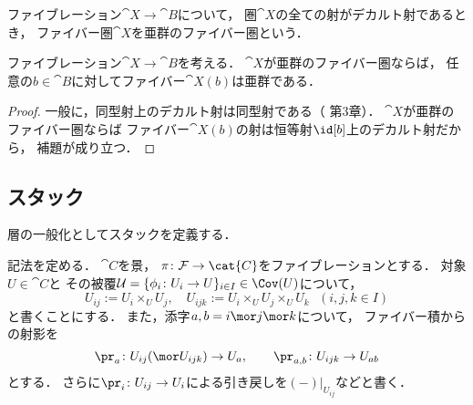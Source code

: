     \begin{Def}
        ファイブレーション$\cat{X} \to \cat{B}$について，
        圏$\cat{X}$の全ての射がデカルト射であるとき，
        ファイバー圏$\cat{X}$を亜群のファイバー圏という．
    \end{Def}

    \begin{Lemma}
        ファイブレーション$\cat{X} \to \cat{B}$を考える．
        $\cat{X}$が亜群のファイバー圏ならば，
        任意の$b \in \cat{B}$に対してファイバー$\cat{X}(b)$は亜群である．
    \end{Lemma}
    \begin{proof}
        一般に，同型射上のデカルト射は同型射である（\cite{FGAexp} 第$3$章）．
        $\cat{X}$が亜群のファイバー圏ならば
        ファイバー$\cat{X}(b)$の射は恒等射$\id[b]$上のデカルト射だから，
        補題が成り立つ．
    \end{proof}

\subsection{スタック}
    層の一般化としてスタックを定義する．

    記法を定める．
    $\cat{C}$を景，
    $\pi \colon \stF \to \cat{C}$をファイブレーションとする．
    対象$U \in \cat{C}$と
    その被覆$\covU=\{\phi_i \colon U_i \to U\}_{i \in I} \in \Cov(U)$について，
    \[ U_{ij}:=U_i \times_U U_j, \quad U_{ijk}:=U_i \times_U U_j \times_U U_k \ \ \ (i,j,k \in I) \]
    と書くことにする．
    また，添字$a,b=i \mor j \mor k$について，
    ファイバー積からの射影を
    \[ \pr_{a} \colon U_{ij} (\mor U_{ijk}) \to U_{a}, \qquad \pr_{a,b} \colon U_{ijk} \to U_{ab} \]
    とする．
    さらに$\pr_{i} \colon U_{ij} \to U_{i}$による引き戻しを$(-)|_{U_{ij}}$などと書く．

